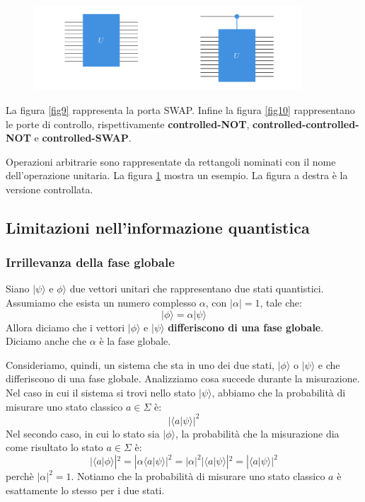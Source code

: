 \begin{figure}[h]
    \centering
    \includegraphics[width = 10cm]{./Images/ucontr.png}
    \caption{}
    \label{fig11}
\end{figure}

La figura \ref{fig9} rappresenta la porta SWAP. Infine la figura \ref{fig10} rappresentano le
porte di controllo, rispettivamente \textbf{controlled-NOT}, \textbf{controlled-controlled-NOT} e \textbf{controlled-SWAP}.

Operazioni arbitrarie sono rappresentate da rettangoli nominati con il nome dell'operazione unitaria.
La figura \ref{fig11} mostra un esempio. La figura a destra è la versione controllata.

\newpage
\subsection{Limitazioni nell'informazione quantistica}
\subsubsection{Irrillevanza della fase globale}
Siano $|\psi\rangle$ e $\phi\rangle$ due vettori unitari che rappresentano due stati 
quantistici. Assumiamo che esista un numero complesso $\alpha$, con $|\alpha| = 1$, tale che:
\begin{equation*}
    |\phi\rangle = \alpha |\psi\rangle
\end{equation*}
Allora diciamo che i vettori $|\phi\rangle$ e $|\psi\rangle$ \textbf{differiscono di una fase globale}.
Diciamo anche che $\alpha$ è la fase globale.

Consideriamo, quindi, un sistema che sta in uno dei due stati, $|\phi\rangle$ o $|\psi\rangle$
e che differiscono di una fase globale. Analizziamo cosa succede durante la misurazione. Nel caso
in cui il sistema si trovi nello stato $|\psi\rangle$, abbiamo che la probabilità di misurare
uno stato classico $a \in \Sigma$ è:
\begin{equation*}
    |\langle a|\psi\rangle|^2
\end{equation*}
Nel secondo caso, in cui lo stato sia $|\phi\rangle$, la probabilità che la misurazione dia come 
risultato lo stato $a \in \Sigma$ è:
\begin{equation*}
    |\langle a|\phi\rangle|^2 = |\alpha\langle a|\psi\rangle|^2 = |\alpha|^2 |\langle a|\psi\rangle|^2 = |\langle a|\psi\rangle|^2
\end{equation*}
perchè $|\alpha|^2 = 1$. Notiamo che la probabilità di misurare uno stato classico $a$ è esattamente lo stesso
per i due stati.

